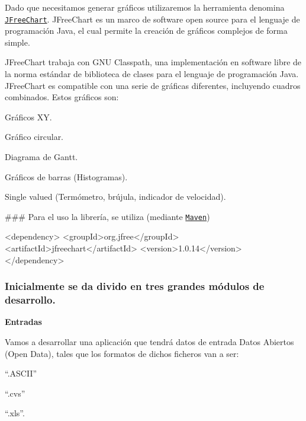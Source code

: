 Dado que necesitamos generar gráficos utilizaremos la herramienta denomina \href{http://www.jfree.org/jfreechart/}{\tt J\+Free\+Chart}. J\+Free\+Chart es un marco de software open source para el lenguaje de programación Java, el cual permite la creación de gráficos complejos de forma simple.

J\+Free\+Chart trabaja con G\+NU Classpath, una implementación en software libre de la norma estándar de biblioteca de clases para el lenguaje de programación Java. J\+Free\+Chart es compatible con una serie de gráficas diferentes, incluyendo cuadros combinados. Estos gráficos son\+:
\begin{DoxyItemize}
\item Gráficos XY.
\item Gráfico circular.
\item Diagrama de Gantt.
\item Gráficos de barras (Histogramas).
\item Single valued (Termómetro, brújula, indicador de velocidad).
\end{DoxyItemize}

\#\#\# Para el uso la librería, se utiliza (mediante \href{https://maven.apache.org/}{\tt Maven}) 
\begin{DoxyCode}
<\textcolor{keywordtype}{dependency}>
    <\textcolor{keywordtype}{groupId}>\textcolor{keyword}{org.jfree}</\textcolor{keywordtype}{groupId}>
    <\textcolor{keywordtype}{artifactId}>\textcolor{keyword}{jfreechart}</\textcolor{keywordtype}{artifactId}>
    <\textcolor{keywordtype}{version}>1.0.14</\textcolor{keywordtype}{version}>
</\textcolor{keywordtype}{dependency}>
\end{DoxyCode}


\subsubsection*{Inicialmente se da divido en tres grandes módulos de desarrollo.}

{\bfseries Entradas}
\begin{DoxyItemize}
\item Vamos a desarrollar una aplicación que tendrá datos de entrada Datos Abiertos (Open Data), tales que los formatos de dichos ficheros van a ser\+:
\begin{DoxyItemize}
\item “.\+A\+S\+C\+I\+I”
\item “.\+cvs”
\item “.\+xls”.
\end{DoxyItemize}
\end{DoxyItemize}

